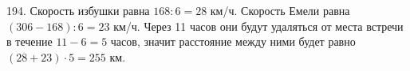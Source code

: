 194. Скорость избушки равна $168:6=28$ км/ч. Скорость Емели равна $(306-168):6=23$ км/ч. Через 11 часов они будут удаляться от места встречи в течение $11-6=5$ часов, значит расстояние между ними будет равно $(28+23)\cdot5=255$ км.\\
